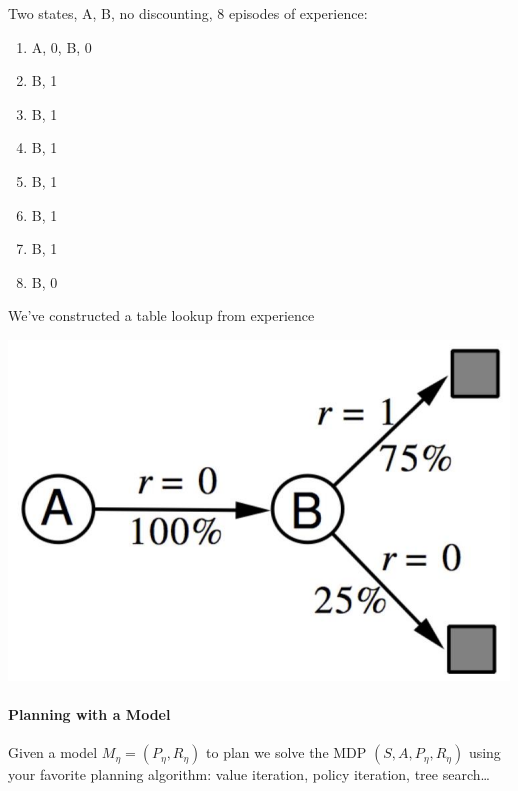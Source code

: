 \documentclass[10pt]{report}
\begin{document}
\begin{multicols}{2}
Two states, A, B, no discounting, 8 episodes of experience:
\begin{enumerate}
	\item A, 0, B, 0
	\item B, 1
	\item B, 1
	\item B, 1
	\item B, 1
	\item B, 1
	\item B, 1
	\item B, 0
\end{enumerate}
We've constructed a table lookup from experience
\columnbreak
\begin{center}
	\includegraphics[scale=0.5]{174.png}
\end{center}
\end{multicols}
\paragraph{Planning with a Model} Given a model $M_\eta = (P_\eta, R_\eta)$ to plan we solve the MDP $(S,A,P_\eta,R_\eta)$ using your favorite planning algorithm: value iteration, policy iteration, tree search\ldots
\end{document}
